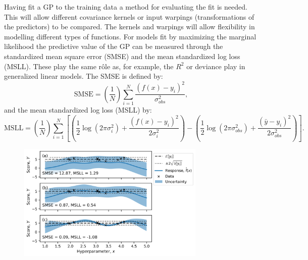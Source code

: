 Having fit a GP to the training data a method for evaluating the fit is needed. This will allow different covariance kernels or input warpings (transformations of the predictors) to be compared. The kernels and warpings will allow flexibility in modelling different types of functions. For models fit by maximizing the marginal likelihood the predictive value of the GP can be measured through the standardized mean square error (SMSE) and the mean standardized log loss (MSLL).\cite{rasmussenGaussianProcessesMachine2006} These play the same r\^ole as, for example, the $R^2$ or deviance play in generalized linear models.\cite{nelder1972generalized} The SMSE is defined by:\cite{rasmussenGaussianProcessesMachine2006} 
\begin{equation}\label{eqn:smse}
\mathrm{SMSE} =\left(\frac{1}{N}\right) \sum_{i=1}^{N} \frac{\left(f(x)-y_{i}\right)^{2}}{\sigma_{obs}^{2}},
\end{equation}
and the mean standardized log loss (MSLL) by:\cite{rasmussenGaussianProcessesMachine2006}
\begin{equation}\label{eqn:msll}
\mathrm{MSLL}=\left(\frac{1}{N}\right) \sum_{i=1}^{N}\left[\left(\frac{1}{2} \log \left(2 \pi \sigma_{i}^{2}\right)+\frac{\left(f(x)-y_{i}\right)^{2}}{2\sigma_{i}^{2}}\right)-\left(\frac{1}{2} \log \left(2 \pi \sigma_{obs}^{2}\right)+\frac{\left(\bar{y}-y_{i}\right)^{2}}{2\sigma_{obs}^{2}}\right)\right].
\end{equation}  

\begin{figure}
    \centering
    \includegraphics[width=0.8\textwidth]{chapters/msm_optimization/figures/gp_metric_explainer.png}
    \label{fig:msm_gp_metric_explainer}
\end{figure}

